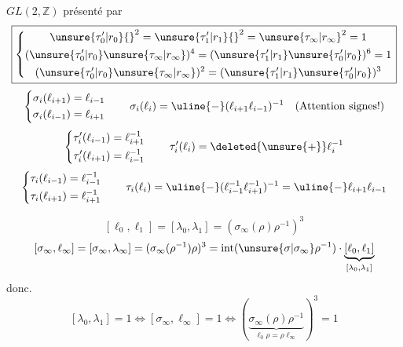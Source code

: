 $GL(2,\mathbb Z)$ présenté par
\[
\boxed{\left\{\begin{gathered}
\unsure{\tau'_0|r_0}{}^2=\unsure{\tau'_1|r_1}{}^2=\unsure{\tau_\infty|r_\infty}^2=1\\
(\unsure{\tau'_0|r_0}\unsure{\tau_\infty|r_\infty})^4=(\unsure{\tau'_1|r_1}\unsure{\tau'_0|r_0})^6=1\\
(\unsure{\tau'_0|r_0}\unsure{\tau_\infty|r_\infty})^2=(\unsure{\tau'_1|r_1}\unsure{\tau'_0|r_0})^3
\end{gathered}\right.}
\]
\[
\left\{\begin{aligned}\sigma_i(\ell_{i+1})&=\ell_{i-1}\\\sigma_i(\ell_{i-1})&=\ell_{i+1}\end{aligned}\right.
\qquad\sigma_i(\ell_i)=\uline{-}(\ell_{i+1}\ell_{i-1})^{-1}\quad(\text{Attention signes!})
\]
\[
\left\{\begin{aligned}\tau'_i(\ell_{i-1})&=\ell_{i+1}^{-1}\\\tau'_i(\ell_{i+1})&=\ell_{i-1}^{-1}\end{aligned}\right.
\qquad\tau'_i(\ell_i)=\deleted{\unsure{+}}\ell_i^{-1}
\]
\[
\left\{\begin{aligned}\tau_i(\ell_{i-1})&=\ell_{i-1}^{-1}\\\tau_i(\ell_{i+1})&=\ell_{i+1}^{-1}\end{aligned}\right.
\qquad\tau_i(\ell_i)=\uline{-}(\ell_{i-1}^{-1}\ell_{i+1}^{-1})^{-1}=\uline{-}\ell_{i+1}\ell_{i-1}
\]

\[
[\ell_0,\ell_1]=[\lambda_0,\lambda_1]=(\sigma_\infty(\rho)\rho^{-1})^3
\]
\[
[\sigma_\infty,\ell_\infty]=[\sigma_\infty,\lambda_\infty]=(\sigma_\infty(\rho^{-1})\rho)^3
=\operatorname{int}(\unsure{\sigma|\sigma_\infty}\rho^{-1})\cdot\underbrace{[\ell_0,\ell_1]}_{[\lambda_0,\lambda_1]}
\]
donc.
\[
[\lambda_0,\lambda_1]=1\Longleftrightarrow[\sigma_\infty,\ell_\infty]=1
\Longleftrightarrow(\underbrace{\sigma_\infty(\rho)\rho^{-1}}_{\ell_0\rho=\rho\ell_\infty})^3=1
\]
\margin{$\unsure{\Vert}$}

